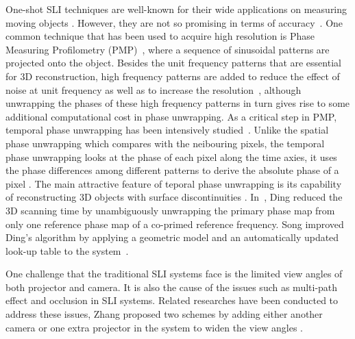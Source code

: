 \documentclass[10pt,letterpaper]{article}
\begin{document}
One-shot SLI techniques are well-known for their wide applications on measuring moving objects \cite{deet17}. However, they are not so promising in terms of accuracy~\cite{zhan12}. One common technique that has been used to acquire high resolution is Phase Measuring Profilometry (PMP)~\cite{srin85}, where a sequence of sinusoidal patterns are projected onto the object.  Besides the unit frequency patterns that are essential for 3D reconstruction, high frequency patterns are added to reduce the effect of noise at unit frequency as well as to increase the resolution~\cite{lijl03}, although unwrapping the phases of these high frequency patterns in turn gives rise to some additional computational cost in phase unwrapping. 
As a critical step in PMP, temporal phase unwrapping has been intensively studied~\cite{zuoc16}. Unlike the spatial phase unwrapping which compares with the neibouring pixels, the temporal phase unwrapping looks at the phase of each pixel along the time axies, it uses the phase differences among different patterns to derive the absolute phase of a pixel \cite{liuy12}. The main attractive feature of teporal phase unwrapping is its capability of reconstructing 3D objects with surface discontinuities \cite{hunt93}.  In~\cite{ding11}, Ding {\etal} reduced the 3D scanning time by unambiguously unwrapping the primary phase map from only one reference phase map of a co-primed reference frequency. Song {\etal} improved Ding's algorithm by applying a geometric model and an automatically updated look-up table to the system~\cite{song18}. 


One challenge that the traditional SLI systems face is the limited view angles of both projector and camera. It is also the cause of the issues such as multi-path effect \cite{otoo16} and occlusion \cite{linj13} in SLI systems. Related researches have been conducted to address these issues, Zhang {\etal} proposed two schemes by adding either another camera or one extra projector in the system to widen the view angles \cite{zhan08, jian18}.
\end{document}
